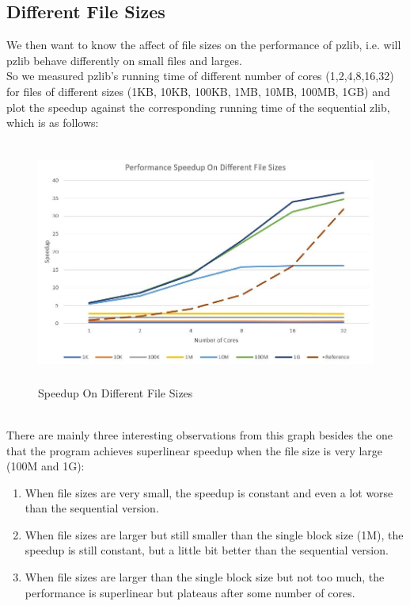 \documentclass[12pt]{article}
\begin{document}
    \subsection{Different File Sizes}
    We then want to know the affect of file sizes on the performance of pzlib, i.e. will pzlib behave differently on small files and larges.\\
    So we measured pzlib's running time of different number of cores (1,2,4,8,16,32) for files of different sizes (1KB, 10KB, 100KB, 1MB, 10MB, 100MB, 1GB) and plot the speedup against the corresponding running time of the sequential zlib, which is as follows:
    \newpage
    \begin{figure}[!h]
    \begin{center}
    \includegraphics[height=8cm]{SpeedupFilesizes.JPG}
    \caption{Speedup On Different File Sizes}
    \end{center}
    \end{figure}
    ~\\
    There are mainly three interesting observations from this graph besides the one that the program achieves superlinear speedup when the file size is very large (100M and 1G):
    \begin{enumerate}
        \item When file sizes are very small, the speedup is constant and even a lot worse than the sequential version.
        \item When file sizes are larger but still smaller than the single block size (1M), the speedup is still constant, but a little bit better than the sequential version.
        \item When file sizes are larger than the single block size but not too much, the performance is superlinear but plateaus after some number of cores.
    \end{enumerate}
\end{document}
